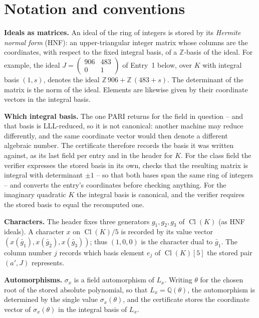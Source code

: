 \documentclass[11pt]{article}
\begin{document}
\section*{Notation and conventions}
\textbf{Ideals as matrices.}  An ideal of the ring of integers is
stored by its \emph{Hermite normal form} (HNF): an upper-triangular
integer matrix whose columns are the coordinates, with respect to
the fixed integral basis, of a $\mathbb Z$-basis of the ideal.
For example, the ideal $J=\left(\begin{smallmatrix}906&483\\0&1\end{smallmatrix}\right)$ of Entry~1 below, over $K$ with
integral basis $(1,s)$, denotes the ideal $\mathbb Z\,906+\mathbb Z\,(483+s)$.  The
determinant of the matrix is the norm of the ideal.  Elements are
likewise given by their coordinate vectors in the integral basis.
\par\medskip
\textbf{Which integral basis.}  The one PARI returns for the field
in question -- and that basis is LLL-reduced, so it is not canonical:
another machine may reduce differently, and the same coordinate
vector would then denote a different algebraic number.  The
certificate therefore records the basis it was written against, as
its last field per entry and in the header for $K$.  For the
class field the verifier expresses the stored basis in its own,
checks that the resulting matrix is integral with determinant
$\pm1$ -- so that both bases span the same ring of integers --
and converts the entry's coordinates before checking anything.
For the imaginary quadratic $K$ the integral basis is canonical,
and the verifier requires the stored basis to equal the
recomputed one.
\par\medskip
\textbf{Characters.}  The header fixes three generators
$g_1,g_2,g_3$ of $\operatorname{Cl}(K)$ (as HNF
ideals).  A character $x$ on $\operatorname{Cl}(K)/5$ is recorded
by its value vector $(x(\bar g_1),x(\bar g_2),
x(\bar g_3))$; thus $(1,0,0)$ is the character dual to
$\bar g_1$.  The column number $j$ records which basis
element $e_j$ of $\operatorname{Cl}(K)[5]$ the stored pair
$(a',J)$ represents.
\par\medskip
\textbf{Automorphisms.}  $\sigma_x$ is a field automorphism of
$L_x$.  Writing $\theta$ for the chosen root of the stored
absolute polynomial, so that $L_x=\mathbb Q(\theta)$, the
automorphism is determined by the single value
$\sigma_x(\theta)$, and the certificate stores the coordinate
vector of $\sigma_x(\theta)$ in the integral basis of $L_x$.
\end{document}
